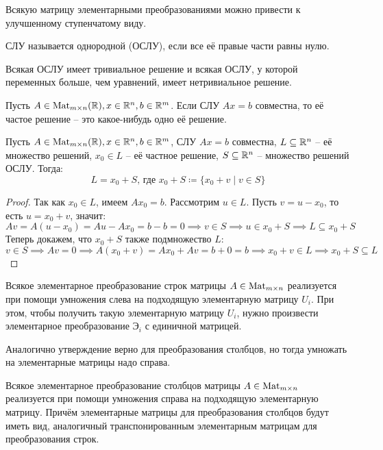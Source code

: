 \documentclass[12pt]{article}
\begin{document}
\begin{theorem}
	Всякую матрицу элементарными преобразованиями можно привести к
	улучшенному ступенчатому виду.
\end{theorem}
\begin{definition}
	СЛУ называется однородной (ОСЛУ), если все её правые части равны нулю.
\end{definition}
\begin{statement}
	Всякая ОСЛУ имеет тривиальное решение и всякая ОСЛУ, у которой
	переменных больше, чем уравнений, имеет нетривиальное решение.
\end{statement}
\begin{definition}
	Пусть $A\in \operatorname{Mat}_{m \times n}(\mathbb{R}), x\in \mathbb{R}^n, b\in \mathbb{R}^m$. Если СЛУ
	$Ax=b$ совместна, то её частое решение -- это какое-нибудь одно её решение.
\end{definition}
\begin{lemma}
	Пусть $A\in \operatorname{Mat}_{m \times n}(\mathbb{R}), x\in \mathbb{R}^n, b\in \mathbb{R}^m$, СЛУ $Ax=b$
	совместна, $L\subseteq \mathbb{R}^n$ -- её множество решений,
	$x_0\in L$ -- её частное решение, $S\subseteq \mathbb{R}^n$ -- множество
	решений ОСЛУ. Тогда:
	\[L=x_0+S\text{, где }x_0+S\coloneqq \{x_0+v\mid v\in S\}\]	
	\begin{proof}
		Так как $x_0\in L$, имеем $Ax_0=b$. Рассмотрим $u\in L$. Пусть
		$v=u-x_0$, то есть $u=x_0+v$, значит:
		\[Av=A(u-x_0)=Au-Ax_0=b-b=0\implies v\in S\implies u\in
		x_0+S\implies L\subseteq x_0+S\]		Теперь докажем, что $x_0+S$ также
		подмножество $L$:
		\[v\in S\implies Av=0\implies A(x_0+v)=Ax_0+Av=b+0=b\implies
		x_0+v\in L\implies x_0+S\subseteq L\]	
	\end{proof}
\end{lemma}
\begin{statement}
	Всякое элементарное преобразование строк матрицы $A\in \operatorname{Mat}_{m\times
	n}$ реализуется при помощи умножения слева на подходящую
	элементарную матрицу $U_i$. При этом, чтобы получить такую
	элементарную матрицу $U_i$, нужно произвести
	элементарное преобразование $\text{Э}_i$ с единичной матрицей.\par

	Аналогично утверждение верно для преобразования столбцов, но тогда
	умножать на элементарные матрицы надо справа.
\end{statement}
\begin{statement}
	Всякое элементарное преобразование столбцов матрицы $A\in \operatorname{Mat}_{m\times
	n}$ реализуется при помощи умножения справа на подходящую
	элементарную матрицу. Причём элементарные матрицы для преобразования
	столбцов будут иметь вид, аналогичный транспонированным элементарным
	матрицам для преобразования строк.
\end{statement}
\end{document}

